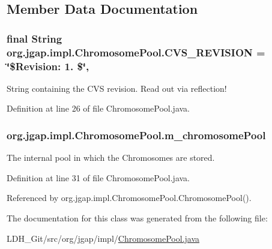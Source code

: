 \subsection{Member Data Documentation}
\hypertarget{classorg_1_1jgap_1_1impl_1_1_chromosome_pool_a33d1323ce195bba5e48f029024db061b}{
\subsubsection[{C\-V\-S\-\_\-\-R\-E\-V\-I\-S\-I\-O\-N}]{\setlength{\rightskip}{0pt plus 5cm}final String org.\-jgap.\-impl.\-Chromosome\-Pool.\-C\-V\-S\-\_\-\-R\-E\-V\-I\-S\-I\-O\-N = \char`\"{}\$Revision\-: 1. \$\char`\"{}\hspace{0.3cm}{\ttfamily [static]}, {\ttfamily [private]}}}\label{classorg_1_1jgap_1_1impl_1_1_chromosome_pool_a33d1323ce195bba5e48f029024db061b}
String containing the C\-V\-S revision. Read out via reflection! 

Definition at line 26 of file Chromosome\-Pool.\-java.

\hypertarget{classorg_1_1jgap_1_1impl_1_1_chromosome_pool_a04c0039ba1e078a78ceecfe2e75cbb22}{
\subsubsection[{m\-\_\-chromosome\-Pool}]{ org.\-jgap.\-impl.\-Chromosome\-Pool.\-m\-\_\-chromosome\-Pool\hspace{0.3cm}{\ttfamily [private]}}}\label{classorg_1_1jgap_1_1impl_1_1_chromosome_pool_a04c0039ba1e078a78ceecfe2e75cbb22}
The internal pool in which the Chromosomes are stored. 

Definition at line 31 of file Chromosome\-Pool.\-java.



Referenced by org.\-jgap.\-impl.\-Chromosome\-Pool.\-Chromosome\-Pool().



The documentation for this class was generated from the following file\-:\begin{DoxyCompactItemize}
\item 
L\-D\-H\-\_\-\-Git/src/org/jgap/impl/\hyperlink{_chromosome_pool_8java}{Chromosome\-Pool.\-java}\end{DoxyCompactItemize}
